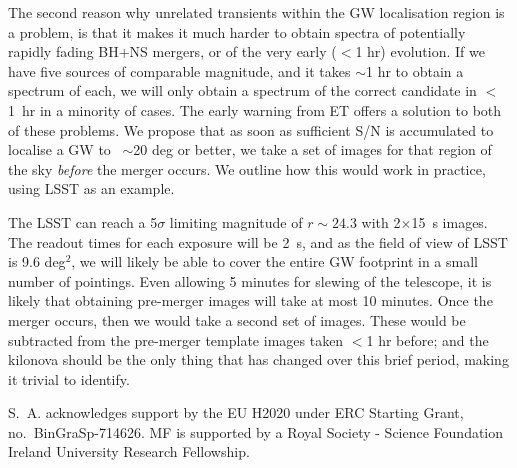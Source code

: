 \documentclass{aa}
\begin{document}
The second reason why unrelated transients within the GW localisation region  is a problem, is that it makes it much harder to obtain spectra of potentially rapidly fading BH+NS mergers, or of the very early ($<$1 hr) evolution. If we have five sources of comparable magnitude, and it takes $\sim$1 hr to obtain a spectrum of each, we will only obtain a spectrum of the correct candidate in $<$1~hr in a minority of cases.
The early warning from ET offers a solution to both of these problems. We propose that as soon as sufficient S/N is accumulated to localise a GW to ~$\sim$20 deg or better, we take a set of images for that region of the sky {\it before} the merger occurs.
We outline how this would work in practice, using LSST as an example.

The LSST can reach a 5$\sigma$ limiting magnitude of $r\sim24.3$ with 2$\times$15~s images. The readout times for each exposure will be 2~s, and as the field of view of LSST is 9.6 deg$^2$, we will likely be able to cover the entire GW footprint in a small number of pointings. Even allowing 5 minutes for slewing of the telescope, it is likely that obtaining pre-merger images will take at most 10 minutes.
Once the merger occurs, then we would take a second set of images. These would be subtracted from the pre-merger template images taken $<$1 hr before; and the kilonova should be the only thing that has changed over this brief period, making it trivial to identify.



\begin{acknowledgements}
 S.~A. acknowledges support by the EU H2020 under ERC Starting Grant, no.~BinGraSp-714626.
 MF is supported by a Royal Society - Science Foundation Ireland University Research Fellowship.
\end{acknowledgements}




\end{document}
